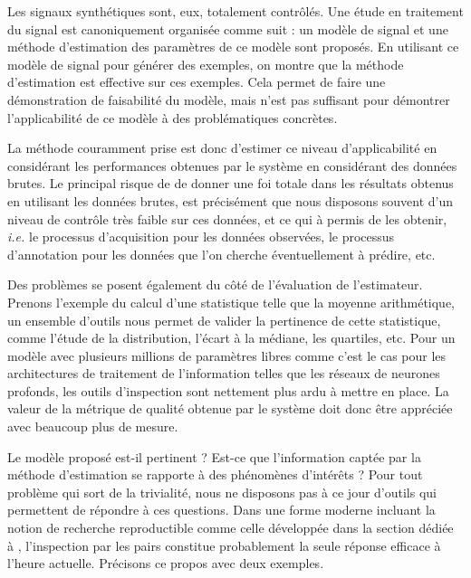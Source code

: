 
Les signaux synthétiques sont, eux, totalement contrôlés. Une étude en traitement du signal est canoniquement organisée comme suit : un modèle de signal et une méthode d'estimation des paramètres de ce modèle sont proposés. En utilisant ce modèle de signal pour générer des exemples, on montre que la méthode d'estimation est effective sur ces exemples. Cela permet de faire une démonstration de faisabilité du modèle, mais n'est pas suffisant pour démontrer l'applicabilité de ce modèle à des problématiques concrètes.

La méthode couramment prise est donc d'estimer ce niveau d'applicabilité en considérant les performances obtenues par le système en considérant des données brutes. Le principal risque de de donner une foi totale dans les résultats obtenus en utilisant les données brutes, est précisément que nous disposons souvent d'un niveau de contrôle très faible sur ces données, et ce qui à permis de les obtenir, \textit{i.e.} le processus d'acquisition pour les données observées, le processus d'annotation pour les données que l'on cherche éventuellement à prédire, etc.

Des problèmes se posent également du côté de l'évaluation de l'estimateur. Prenons l'exemple du calcul d'une statistique telle que la moyenne arithmétique, un ensemble d'outils nous permet de valider la pertinence de cette statistique, comme l'étude de la distribution, l'écart à la médiane, les quartiles, etc. Pour un modèle avec plusieurs millions de paramètres libres comme c'est le cas pour les architectures de traitement de l'information telles que les réseaux de neurones profonds, les outils d'inspection sont nettement plus ardu à mettre en place. La valeur de la métrique de qualité obtenue par le système doit donc être appréciée avec beaucoup plus de mesure.

Le modèle proposé est-il pertinent ? Est-ce que l'information captée par la méthode d'estimation se rapporte à des phénomènes d'intérêts ? Pour tout problème qui sort de la trivialité, nous ne disposons pas à ce jour d'outils qui permettent de répondre à ces questions. Dans une forme moderne incluant la notion de recherche reproductible comme celle développée dans la section dédiée à , l'inspection par les pairs constitue probablement la seule réponse efficace à l'heure actuelle. Précisons ce propos avec deux exemples.

